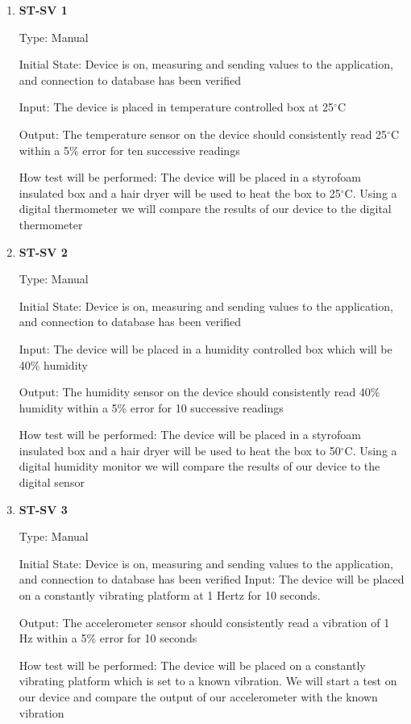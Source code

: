 \documentclass[12pt, titlepage]{article}
\begin{document}
\begin{enumerate}

\item{\bf{ST-SV 1}}

Type: Manual
					
Initial State: Device is on, measuring and sending values to the application, and connection to database has been verified
					
Input: The device is placed in temperature controlled box at 25$^{\circ}$C
					
Output: The temperature sensor on the device should consistently read 25$^{\circ}$C within a 5\% error for ten successive readings 

					
How test will be performed: The device will be placed in a styrofoam insulated box and a hair dryer will be used to heat the box to 25$^{\circ}$C. Using a digital thermometer we will compare the results of our device to the digital thermometer\\

		
\item{\bf{ST-SV 2}}

Type: Manual
					
Initial State: Device is on, measuring and sending values to the application, and connection to database has been verified
					
Input: The device will be placed in a humidity controlled box which will be 40\% humidity
					
Output: The humidity sensor on the device should consistently read 40\% humidity within a 5\% error for 10 successive readings

How test will be performed: The device will be placed in a styrofoam insulated box and a hair dryer will be used to heat the box to 50$^{\circ}$C. Using a digital humidity monitor we will compare the results of our device to the digital sensor

\item{\bf{ST-SV 3}}

Type: Manual
					
Initial State: Device is on, measuring and sending values to the application, and connection to database has been verified
Input: The device will be placed on a constantly vibrating platform at 1 Hertz for 10 seconds.
					
Output: The accelerometer sensor should consistently read a vibration of 1 Hz within a 5\% error for 10 seconds

How test will be performed: The device will be placed on a constantly vibrating platform which is set to a known vibration. We will start a test on our device and compare the output of our accelerometer with the known vibration

\end{enumerate}
\end{document}
